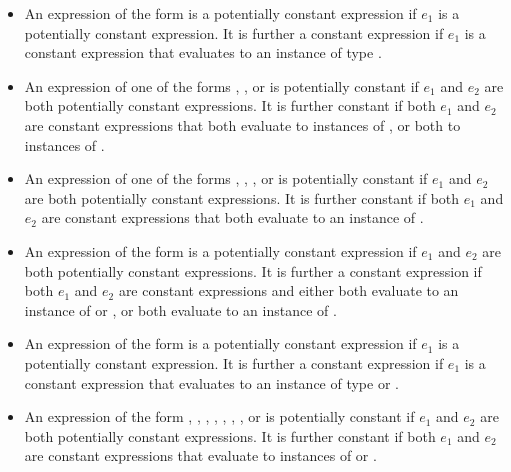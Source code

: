 \documentclass[makeidx]{article}
\begin{document}
{\begin{itemize}
\item An expression of the form  is a potentially constant expression if $e_1$ is a potentially constant expression. It is further a constant expression if $e_1$ is a constant expression that evaluates to an instance of type .

\item An expression of one of the forms ,
  , or  is potentially constant
  if $e_1$ and $e_2$ are both potentially constant expressions.
  It is further constant if both $e_1$ and $e_2$ are constant expressions that
  both evaluate to instances of , or both to instances of .

\item An expression of one of the forms ,
  , ,
  or  is potentially constant
  if $e_1$ and $e_2$ are both potentially constant expressions.
  It is further constant if both $e_1$ and $e_2$ are constant expressions that
  both evaluate to an instance of .

\item An expression of the form  is
  a potentially constant expression if $e_1$ and $e_2$
  are both potentially constant expressions.
  It is further a constant expression if both $e_1$ and $e_2$ are constant expressions
  and either both evaluate to an instance of  or ,
  or both evaluate to an instance of .

\item An expression of the form  is a potentially constant expression
  if $e_1$ is a potentially constant expression.
  It is further a constant expression if $e_1$ is a constant expression that
  evaluates to an instance of type  or .

\item An expression of the form , ,
  , , ,
  , , or 
  is potentially constant
  if $e_1$ and $e_2$ are both potentially constant expressions.
  It is further constant if both $e_1$ and $e_2$ are constant expressions that
  evaluate to instances of  or .


\end{itemize}}
\end{document}
